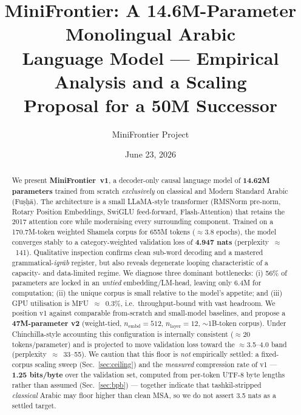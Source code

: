 \documentclass[10pt,twocolumn]{article}
\title{\textbf{MiniFrontier: A 14.6M-Parameter Monolingual Arabic\\
Language Model --- Empirical Analysis and a Scaling\\ Proposal for a 50M Successor}}
\author[1]{MiniFrontier Project}
\affil[1]{Independent Research --- Classical Arabic Language Modelling Lab}
\date{June 23, 2026}
\begin{document}
\maketitle

\begin{abstract}
\noindent
We present \textbf{MiniFrontier~v1}, a decoder-only causal language model of
\textbf{14.62M parameters} trained from scratch \emph{exclusively} on classical
and Modern Standard Arabic (Fu\d{s}\d{h}\=a). The architecture is a small
LLaMA-style transformer (RMSNorm pre-norm, Rotary Position Embeddings, SwiGLU
feed-forward, Flash-Attention) that retains the 2017 attention core while
modernising every surrounding component. Trained on a 170.7M-token weighted
Shamela corpus for 655M tokens ($\approx$3.8 epochs), the model converges stably
to a category-weighted validation loss of \textbf{4.947 nats}
(perplexity~$\approx$~141). Qualitative inspection confirms clean sub-word
decoding and a mastered grammatical-\emph{i\d{q}r\=ab} register, but also reveals
degenerate looping characteristic of a capacity- and data-limited regime. We
diagnose three dominant bottlenecks: (i) 56\% of parameters are locked in an
\emph{untied} embedding/LM-head, leaving only 6.4M for computation;
(ii) the unique corpus is small relative to the model's appetite; and
(iii) GPU utilisation is MFU~$\approx$~0.3\%, i.e.\ throughput-bound with vast
headroom. We position v1 against comparable from-scratch and small-model
baselines, and propose a \textbf{47M-parameter v2} (weight-tied,
$n_{\text{embd}}{=}512$, $n_{\text{layer}}{=}12$, $\sim$1B-token corpus). Under
Chinchilla-style accounting this configuration is internally consistent
($\approx$20 tokens/parameter) and is projected to move validation loss toward the
$\approx$3.5--4.0 band (perplexity~$\approx$~33--55). We caution that this floor is
\emph{not} empirically settled: a fixed-corpus scaling sweep (Sec.~\ref{sec:ceiling})
and the \emph{measured} compression rate of v1 --- \textbf{1.25 bits/byte} over the
validation set, computed from per-token UTF-8 byte lengths rather than assumed
(Sec.~\ref{sec:bpb}) --- together indicate that tashk\=il-stripped \emph{classical}
Arabic may floor higher than clean MSA, so we do not assert 3.5 nats as a settled target.
\end{abstract}

\end{document}
